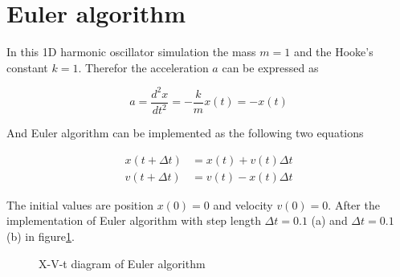 \documentclass[a4paper,12pt]{article}
\begin{document}
\section{Euler algorithm}

In this 1D harmonic oscillator simulation the mass $m = 1$ and the Hooke's constant $k = 1$. Therefor the acceleration $a$ can be expressed as 

\begin{equation}
    a =\frac{d^2x}{dt^2} = - \frac{k}{m} x(t) = -x(t)
\end{equation}

And Euler algorithm can be implemented as the following two equations 

\begin{equation}
    \begin{aligned}
    x(t+\Delta t) &= x(t)+v(t)\Delta t \\
    v(t+\Delta t) &= v(t)-x(t)\Delta t        
    \end{aligned}
\end{equation}

The initial values are position $x(0) = 0$ and velocity $v(0) = 0$. After the implementation of Euler algorithm with step length $\Delta t = 0.1$ (a) and $\Delta t = 0.1$ (b) in figure\ref{x_v_Euler}.

\begin{figure}[!htbp]
    \centering

    \caption{X-V-t diagram of Euler algorithm}
    \label{x_v_Euler}
\end{figure}
\end{document}
